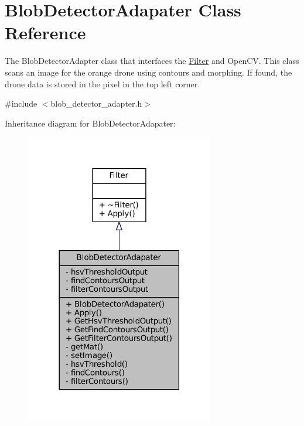 \hypertarget{classBlobDetectorAdapater}{}\section{Blob\+Detector\+Adapater Class Reference}
\label{classBlobDetectorAdapater}


The Blob\+Detector\+Adapter class that interfaces the \hyperlink{classFilter}{Filter} and Open\+CV. This class scans an image for the orange drone using contours and morphing. If found, the drone data is stored in the pixel in the top left corner.  




{\ttfamily \#include $<$blob\+\_\+detector\+\_\+adapter.\+h$>$}



Inheritance diagram for Blob\+Detector\+Adapater\+:\nopagebreak
\begin{figure}[H]
\begin{center}
\leavevmode
\includegraphics[width=233pt]{classBlobDetectorAdapater__inherit__graph}
\end{center}
\end{figure}


